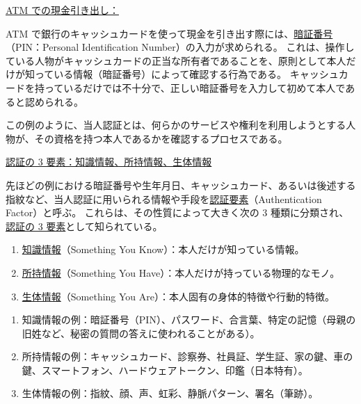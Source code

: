 \documentclass[uplatex]{jsarticle}
\def\label#1{}%
\begin{document}
\underline{ATM での現金引き出し：}

\begin{exa}\label{exa:ch2-atm}
ATM で銀行のキャッシュカードを使って現金を引き出す際には、\underline{暗証番号}（PIN：Personal Identification Number）の入力が求められる。
これは、操作している人物がキャッシュカードの正当な所有者であることを、原則として本人だけが知っている情報（暗証番号）によって確認する行為である。
キャッシュカードを持っているだけでは不十分で、正しい暗証番号を入力して初めて本人であると認められる。
\end{exa}

この例のように、当人認証とは、何らかのサービスや権利を利用しようとする人物が、その資格を持つ本人であるかを確認するプロセスである。

\underline{認証の 3 要素：知識情報、所持情報、生体情報}

\begin{dfn}[認証要素と認証の 3 要素]\label{dfn:authentication-factors}
先ほどの例における暗証番号や生年月日、キャッシュカード、あるいは後述する指紋など、当人認証に用いられる情報や手段を\underline{認証要素}（Authentication Factor）と呼ぶ。
これらは、その性質によって大きく次の 3 種類に分類され、\underline{認証の 3 要素}として知られている。
\begin{enumerate}
\item \underline{知識情報}（Something You Know）：本人だけが知っている情報。
\item \underline{所持情報}（Something You Have）：本人だけが持っている物理的なモノ。
\item \underline{生体情報}（Something You Are）：本人固有の身体的特徴や行動的特徴。
\end{enumerate}
\end{dfn}

\begin{exa}\label{exa:ch2-factor-examples}
\begin{enumerate}
\item 知識情報の例：暗証番号（PIN）、パスワード、合言葉、特定の記憶（母親の旧姓など、秘密の質問の答えに使われることがある）。
\item 所持情報の例：キャッシュカード、診察券、社員証、学生証、家の鍵、車の鍵、スマートフォン、ハードウェアトークン、印鑑（日本特有）。
\item 生体情報の例：指紋、顔、声、虹彩、静脈パターン、署名（筆跡）。
\end{enumerate}
\end{exa}
\end{document}
